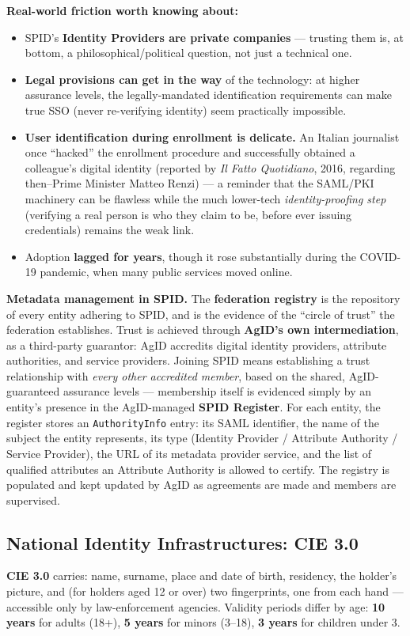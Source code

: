 \documentclass[12pt, a4paper]{article}
\begin{document}
\textcolor{red!70!black}{\textbf{Real-world friction worth knowing about:}}
\begin{itemize}
    \item SPID's \textbf{Identity Providers are private companies} --- trusting them is, at bottom, a philosophical/political question, not just a technical one.
    \item \textbf{Legal provisions can get in the way} of the technology: at higher assurance levels, the legally-mandated identification requirements can make true SSO (never re-verifying identity) seem practically impossible.
    \item \textbf{User identification during enrollment is delicate.} An Italian journalist once ``hacked'' the enrollment procedure and successfully obtained a colleague's digital identity (reported by \textit{Il Fatto Quotidiano}, 2016, regarding then--Prime Minister Matteo Renzi) --- a reminder that the SAML/PKI machinery can be flawless while the much lower-tech \emph{identity-proofing step} (verifying a real person is who they claim to be, before ever issuing credentials) remains the weak link.
    \item Adoption \textbf{lagged for years}, though it rose substantially during the COVID-19 pandemic, when many public services moved online.
\end{itemize}

\textbf{Metadata management in SPID.} The \textbf{federation registry} is the repository of every entity adhering to SPID, and is the evidence of the ``circle of trust'' the federation establishes. Trust is achieved through \textbf{AgID's own intermediation}, as a third-party guarantor: AgID accredits digital identity providers, attribute authorities, and service providers. Joining SPID means establishing a trust relationship with \emph{every other accredited member}, based on the shared, AgID-guaranteed assurance levels --- membership itself is evidenced simply by an entity's presence in the AgID-managed \textbf{SPID Register}. For each entity, the register stores an \texttt{AuthorityInfo} entry: its SAML identifier, the name of the subject the entity represents, its type (Identity Provider / Attribute Authority / Service Provider), the URL of its metadata provider service, and the list of qualified attributes an Attribute Authority is allowed to certify. The registry is populated and kept updated by AgID as agreements are made and members are supervised.

\subsection{National Identity Infrastructures: CIE 3.0}
\label{subsec:cie-06}
\textbf{CIE 3.0} carries: name, surname, place and date of birth, residency, the holder's picture, and (for holders aged 12 or over) two fingerprints, one from each hand --- accessible only by law-enforcement agencies. Validity periods differ by age: \textbf{10 years} for adults (18+), \textbf{5 years} for minors (3--18), \textbf{3 years} for children under 3.
\end{document}
